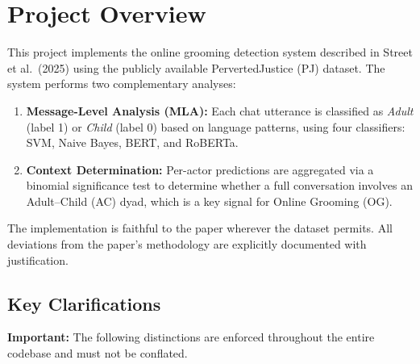 \documentclass[12pt,a4paper]{article}
\begin{document}
\tableofcontents
\newpage

\section{Project Overview}

This project implements the online grooming detection system described in
Street et al.\ (2025) using the publicly available PervertedJustice (PJ)
dataset. The system performs two complementary analyses:

\begin{enumerate}[leftmargin=*, label=\textbf{\arabic*.}]
  \item \textbf{Message-Level Analysis (MLA):} Each chat utterance is
        classified as \emph{Adult} (label 1) or \emph{Child} (label 0) based
        on language patterns, using four classifiers: SVM, Naive Bayes, BERT,
        and RoBERTa.

  \item \textbf{Context Determination:} Per-actor predictions are aggregated
        via a binomial significance test to determine whether a full
        conversation involves an Adult--Child (AC) dyad, which is a key signal
        for Online Grooming (OG).
\end{enumerate}

The implementation is faithful to the paper wherever the dataset permits.
All deviations from the paper's methodology are explicitly documented with
justification.

\subsection{Key Clarifications}

\begin{cautionbox}
\textbf{Important:} The following distinctions are enforced throughout the
entire codebase and must not be conflated.
\end{cautionbox}
\end{document}
